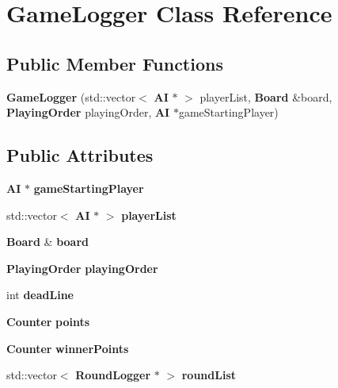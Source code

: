 \section{Game\-Logger Class Reference}
\label{class_game_logger}
\subsection*{Public Member Functions}
\begin{DoxyCompactItemize}
\item 
{\bfseries Game\-Logger} (std\-::vector$<$ {\bf A\-I} $\ast$ $>$ player\-List, {\bf Board} \&board, {\bf Playing\-Order} playing\-Order, {\bf A\-I} $\ast$game\-Starting\-Player)\label{class_game_logger_acff310e7ffc7d3f0d2a03d2477f544db}

\end{DoxyCompactItemize}
\subsection*{Public Attributes}
\begin{DoxyCompactItemize}
\item 
{\bf A\-I} $\ast$ {\bfseries game\-Starting\-Player}\label{class_game_logger_aa03a6b6665f313bb467f62ec2571bac7}

\item 
std\-::vector$<$ {\bf A\-I} $\ast$ $>$ {\bfseries player\-List}\label{class_game_logger_a4f771b8f41e5ad1ae672cbdb8ccd76f0}

\item 
{\bf Board} \& {\bfseries board}\label{class_game_logger_a3d3f1f36f81207d7941880335743fd99}

\item 
{\bf Playing\-Order} {\bfseries playing\-Order}\label{class_game_logger_a4b1ae46a49a5024fff5733edb086cf06}

\item 
int {\bfseries dead\-Line}\label{class_game_logger_a82b29d0bcb07c6cf3f4bd2f9ce0d448d}

\item 
{\bf Counter} {\bf points}
\item 
{\bf Counter} {\bfseries winner\-Points}\label{class_game_logger_ab8c908df65171b42b385caeac894ebaf}

\item 
std\-::vector$<$ {\bf Round\-Logger} $\ast$ $>$ {\bfseries round\-List}\label{class_game_logger_aa42fafc2dd8b04786dd6f6ff5dd75bc3}

\end{DoxyCompactItemize}


